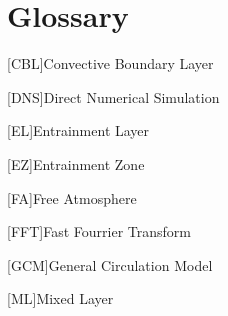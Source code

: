 
\chapter{Glossary}







\begin{acronym}
[CBL]{Convective Boundary Layer}
\end{acronym}

\begin{acronym}
[DNS]{Direct Numerical Simulation}
\end{acronym}

\begin{acronym}
[EL]{Entrainment Layer}
\end{acronym}

\begin{acronym}
[EZ]{Entrainment Zone}
\end{acronym}


\begin{acronym}
[FA]{Free Atmosphere}
\end{acronym}

\begin{acronym}
[FFT]{Fast Fourrier Transform}
\end{acronym}

\begin{acronym}
[GCM]{General Circulation Model}
\end{acronym}

\begin{acronym}
[ML]{Mixed Layer}
\end{acronym}

